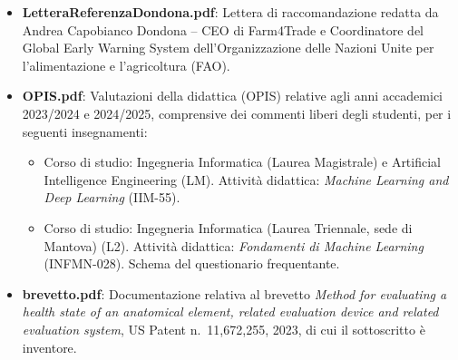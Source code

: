 \documentclass[letterpaper,11pt]{article}
\begin{document}
\begin{itemize}
    \item \textbf{LetteraReferenzaDondona.pdf}: Lettera di raccomandazione redatta da Andrea Capobianco Dondona -- CEO di Farm4Trade e Coordinatore del Global Early Warning System dell'Organizzazione delle Nazioni Unite per l'alimentazione e l'agricoltura (FAO).
    \item \textbf{OPIS.pdf}: Valutazioni della didattica (OPIS) relative agli anni accademici 2023/2024 e 2024/2025, comprensive dei commenti liberi degli studenti, per i seguenti insegnamenti:
\begin{itemize}
    \item Corso di studio: Ingegneria Informatica (Laurea Magistrale) e Artificial Intelligence Engineering (LM). Attività didattica: \textit{Machine Learning and Deep Learning} (IIM-55).
    \item Corso di studio: Ingegneria Informatica (Laurea Triennale, sede di Mantova) (L2). Attività didattica: \textit{Fondamenti di Machine Learning} (INFMN-028). Schema del questionario frequentante.
\end{itemize}

\item \textbf{brevetto.pdf}: Documentazione relativa al brevetto \textit{Method for evaluating a health state of an anatomical element, related evaluation device and related evaluation system}, US Patent n.~11,672,255, 2023, di cui il sottoscritto è inventore.


\end{itemize}
\end{document}
